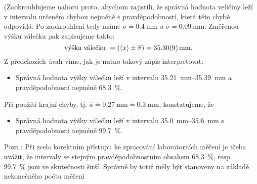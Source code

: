 \begin{mdframed}[style=mdexam]
\begin{example}
    (Zaokrouhlujeme nahoru proto, abychom zajistili, že správná hodnota veličiny leží v intervalu
    určeném chybou nejméně s pravděpodobností, která této chybě odpovídá. Po zaokrouhlení tedy máme
    \(\sigma \doteq \SI{0.4}{\mm}\) a \(\overline{\sigma} = \SI{0.09}{\mm}\). Změřenou výšku válečku
    pak zapisujeme takto:
    \begin{equation*}
      \text{výška válečku } = (\langle x \rangle\pm \overline{\sigma}) = \SI{35.30 \pm 0.09}{\mm}.
    \end{equation*}
    Z předchozích úvah víme, jak je nutno takový zápis interpretovat:
    \begin{itemize}
      \item Správná hodnota výšky válečku leží v intervalu \SIrange[range-units =
            brackets]{35.21}{35.39}{\mm} a pravděpodobností nejméně \SI{68.3}{\percent}.
    \end{itemize}
    Při použití krajní chyby, tj. \(\overline{\kappa} \doteq \SI{0.27}{\mm} \doteq \SI{0.3}{\mm}\),
    konstatujeme, že
    \begin{itemize}
      \item Správná hodnota výšky válečku leží v intervalu \SIrange[range-units =
            brackets]{35.0}{35.6}{\mm} s pravděpodobnosti nejméně \SI{99.7}{\percent}.
    \end{itemize}
    Pozn.: Při zcela korektním přístupu ke zpracování laboratorních měření je třeba uvážit, že
    intervaly se stejným pravděpodobnostním obsahem \SI{68.3}{\percent}, resp. \SI{99.7}{\percent}
    jsou ve skutečnosti širší. Správně by totiž měly být stanoveny na základě nekonečného počtu
    měření
  \end{example}
\end{mdframed}
